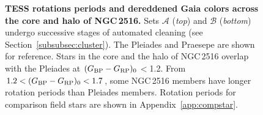 \documentclass[12pt,twocolumn,tighten]{aastex63}
\newcommand{\cn}{NGC\,2516} %
\newcommand{\bpmrpo}{(G_{\rm BP}-G_{\rm RP})_0}
\begin{document}
\begin{figure}[t]
	\begin{center}
		\leavevmode

    \vspace{-0.5cm}
	\end{center}
	\vspace{-0.7cm}
  \caption{ {\bf TESS rotations periods and dereddened Gaia colors
  across the core and halo of \cn.} Sets $\mathcal{A}$ ({\it top})
  and $\mathcal{B}$ ({\it bottom}) undergo successive stages of
  automated cleaning (see Section~\ref{subsubsec:cluster}).  The Pleiades
  \citep[125\,Myr;][]{rebull_rotation_2016a} and Praesepe
  \citep[650\,Myr;][]{douglas_poking_2017} are shown for reference.
  Stars in the core and the halo of NGC\,2516 overlap with the
  Pleiades at $\bpmrpo$$<$1.2.  From $1.2<\bpmrpo<1.7$, some NGC\,2516
  members have longer rotation periods than Pleiades members. Rotation
  periods for comparison field stars are shown in
  Appendix~\ref{app:compstar}.
  \label{fig:rot}
	}
\end{figure}
\end{document}
